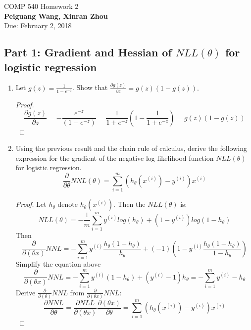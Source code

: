 \documentclass[]{book}
\theoremstyle{definition}
\begin{document}
\begin{center}
{\Large COMP 540 \hspace{0.5cm} Homework 2}\\
\textbf{Peiguang Wang, Xinran Zhou}\\ %
Due: February 2, 2018 %
\end{center}

\vspace{0.2 cm}

\subsection*{Part 1: Gradient and Hessian of $NLL(\theta)$ for logistic regression}
\begin{enumerate}
	\item
	Let $g(z)=\frac{1}{1-e^{-z}}$. Show that $\frac{\partial g(z)}{\partial z}=g(z)(1-g(z)).$
	\begin{proof}
		$$\frac{\partial g(z)}{\partial z} = -\frac{e^{-z}}{(1-e^{-z})} = \frac{1}{1+e^{-z}} (1 - \frac{1}{1+e^{-z}}) = g(z)(1-g(z))$$
	\end{proof}
	
	\item
	Using the previous result and the chain rule of calculus, derive the following expression for the gradient of the negative log likelihood function $NLL(\theta)$ for logistic
	regression.
	$$\frac{\partial }{\partial \theta} NNL(\theta)=\sum_{i = 1}^{m}(h_{\theta}(x^{(i)}) - y^{(i)})x^{(i)}$$
	
	\begin{proof}
		Let $h_{\theta}$ denote $h_{\theta}(x^{(i)})$. Then the $NLL(\theta)$ is:
		$$NLL(\theta) = - \frac{1}{m} \sum_{i = 1}^{m} y^{(i)} log(h_{\theta}) + (1-y^{(i)})log(1-h_{\theta})$$
		Then
		$$\frac{\partial }{\partial (\theta x) } NNL= - \sum_{i = 1}^{m} y^{(i)} \frac{h_{\theta}(1 - h_{\theta})}{h_{\theta}} + (-1)(1 - y^{(i)} \frac{h_{\theta}(1 - h_{\theta})}{1 - h_{\theta}})$$
		Simplify the equation above
		$$\frac{\partial }{\partial (\theta x) } NNL= - \sum_{i = 1}^{m} y^{(i)} (1 - h_{\theta}) + (y^{(i)} - 1) h_{\theta} = -\sum_{i = 1}^{m} y^{(i)} - h_{\theta}$$
		Derive $\frac{\partial }{\partial (\theta) } NNL $ from $\frac{\partial }{\partial (\theta x) } NNL $:
		$$\frac{\partial NNL }{\partial \theta } = \frac{\partial NLL }{\partial (\theta x) } \frac{\partial (\theta x)}{\partial \theta } = \sum_{i = 1}^{m}(h_{\theta}(x^{(i)}) - y^{(i)})x^{(i)}$$
		

\end{proof}
\end{enumerate}
\end{document}

